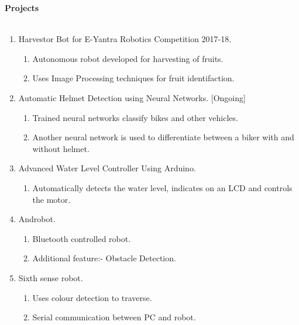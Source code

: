 \documentclass[15pt]{article}
\begin{document}
\begin{flushleft}
	{\textbf{Projects}} \\
	\vspace{0.5mm}
	\noindent \hrulefill 
	\vspace{0.5mm} \\
	\begin{enumerate}
		\item Harvestor Bot for E-Yantra Robotics Competition 2017-18. \begin{enumerate}
			\item Autonomous robot developed for harvesting of fruits.
			\item Uses Image Processing techniques for fruit identifaction.
		\end{enumerate} 
		\item Automatic Helmet Detection using Neural Networks. [Ongoing]
		\begin{enumerate}
			\item Trained neural networks classify bikes and other vehicles.
			\item Another neural network is used to differentiate between a biker with and without helmet.
		\end{enumerate}
		\item Advanced Water Level Controller Using Arduino.
		\begin{enumerate}
			\item Automatically detects the water level, indicates on an LCD and controls the motor.
		\end{enumerate}
		\item Androbot.
		\begin{enumerate}
			\item Bluetooth controlled robot.
			\item Additional feature:- Obstacle Detection.
		\end{enumerate}
		\item Sixth sense robot.
		\begin{enumerate}
			\item Uses colour detection to traverse.
			\item Serial communication between PC and robot.
		\end{enumerate}
	\end{enumerate}
\end{flushleft}
\vspace{1mm}
\end{document}
